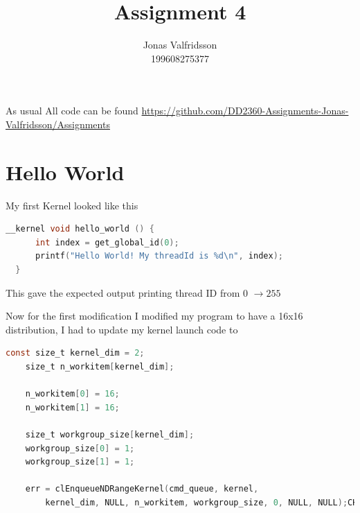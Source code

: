 \documentclass{article}
\title{Assignment 4}
\date{}
\author{Jonas Valfridsson\\199608275377}
\begin{document}
\maketitle

As usual All code can be found \href{https://github.com/DD2360-Assignments-Jonas-Valfridsson/Assignments}{https://github.com/DD2360-Assignments-Jonas-Valfridsson/Assignments}
\tableofcontents

\newpage  

\section{Hello World}%
\label{sec:hello_world}



My first Kernel looked like this

\begin{mdframed}[backgroundcolor=codeColor,leftmargin=0.0cm,hidealllines=true,%
  innerleftmargin=0.1cm,innerrightmargin=0.1cm,innertopmargin=0.5cm,innerbottommargin=0.10cm,
  roundcorner=15pt]
\begin{lstlisting}[language=C]
  __kernel void hello_world () {                                                                                                                                             
      int index = get_global_id(0);                                                                                                     
      printf("Hello World! My threadId is %d\n", index);                                                                                                                                                                                 
  }                                                      
\end{lstlisting}
\end{mdframed}

This gave the expected output printing thread ID from 0 $\rightarrow 255$

Now for the first modification I modified my program to have a 16x16 distribution, I had to update my kernel launch code to

\begin{mdframed}[backgroundcolor=codeColor,leftmargin=0.0cm,hidealllines=true,%
  innerleftmargin=0.1cm,innerrightmargin=0.1cm,innertopmargin=0.5cm,innerbottommargin=0.10cm,
  roundcorner=15pt]
\begin{lstlisting}[language=C]
    const size_t kernel_dim = 2;
    size_t n_workitem[kernel_dim];
  
    n_workitem[0] = 16;
    n_workitem[1] = 16;
  
    size_t workgroup_size[kernel_dim];
    workgroup_size[0] = 1;
    workgroup_size[1] = 1;
  
    err = clEnqueueNDRangeKernel(cmd_queue, kernel, 
        kernel_dim, NULL, n_workitem, workgroup_size, 0, NULL, NULL);CHK_ERROR(err);
\end{lstlisting}
\end{mdframed}
\end{document}
